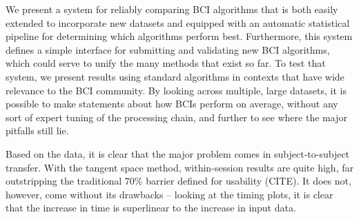 We present a system for reliably comparing BCI algorithms that is both easily
extended to incorporate new datasets and equipped with an automatic statistical
pipeline for determining which algorithms perform best. Furthermore, this system
defines a simple interface for submitting and validating new BCI algorithms,
which could serve to unify the many methods that exist so far. To test that
system, we present results using standard algorithms in contexts that have wide
relevance to the BCI community. By looking across multiple, large datasets, it is possible to make statements about how BCIs perform on average, without any sort of expert tuning of the processing chain, and further to see where the major pitfalls still lie.

Based on the data, it is clear that the major problem comes in
subject-to-subject transfer. With the tangent space method, within-session
results are quite high, far outstripping the traditional 70\% barrier defined
for usability (CITE). It does not, however, come without its drawbacks -- looking at the timing plots, it is clear that the increase in time is superlinear to the increase in input data. 
